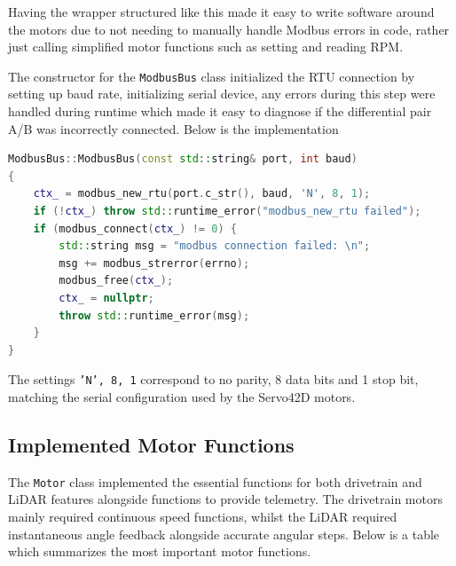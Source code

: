 Having the wrapper structured like this made it easy to write software around the motors due to not needing to manually handle Modbus errors in code, rather just calling simplified motor functions such as setting and reading RPM.

The constructor for the \texttt{ModbusBus} class initialized the RTU connection by setting up baud rate, initializing serial device, any errors during this step were handled during runtime which made it easy to diagnose if the differential pair A/B was incorrectly connected. 
Below is the implementation
\begin{lstlisting}[language=C++, caption={Modbus bus constructor}, label={lst:bus_constructor}]
ModbusBus::ModbusBus(const std::string& port, int baud)
{
    ctx_ = modbus_new_rtu(port.c_str(), baud, 'N', 8, 1);
    if (!ctx_) throw std::runtime_error("modbus_new_rtu failed");
    if (modbus_connect(ctx_) != 0) {
        std::string msg = "modbus connection failed: \n";
        msg += modbus_strerror(errno);
        modbus_free(ctx_);
        ctx_ = nullptr;
        throw std::runtime_error(msg);
    }
}
\end{lstlisting}
The settings \texttt{'N', 8, 1} correspond to no parity, 8 data bits and 1 stop bit, matching the serial configuration used by the Servo42D motors.



\subsection{Implemented Motor Functions}
The \texttt{Motor} class implemented the essential functions for both drivetrain and LiDAR features alongside functions to provide telemetry.
The drivetrain motors mainly required continuous speed functions, whilst the LiDAR required instantaneous angle feedback alongside accurate angular steps.
Below is a table which summarizes the most important motor functions.

